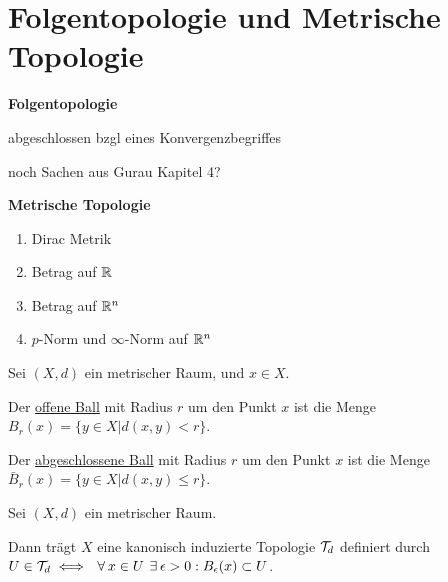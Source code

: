 \section{Folgentopologie und Metrische Topologie}

\textbf{Folgentopologie}


\begin{definition}[Folgentopologie]
    abgeschlossen bzgl eines Konvergenzbegriffes
\end{definition}

\begin{definition}[Folgenkompakt]
    
\end{definition}

noch Sachen aus Gurau Kapitel 4?



\textbf{Metrische Topologie}


\begin{definition}
    
\end{definition}

\begin{example}
    \begin{enumerate}
        \item Dirac Metrik
        \item Betrag auf $\mathbb{R}$
        \item Betrag auf $\mathbb{R}^n$
        \item $p$-Norm und $\infty$-Norm auf $\mathbb{R}^n$
    \end{enumerate}
\end{example}

\begin{definition}
    Sei $(X, d)$ ein metrischer Raum, und $x \in X$.

    Der \underline{offene Ball} mit Radius $r$ um den Punkt $x$ ist die Menge $B_r(x) = \{y \in X | d(x,y) < r\}$.

    Der \underline{abgeschlossene Ball} mit Radius $r$ um den Punkt $x$ ist die Menge $\bar{B}_r(x) = \{y \in X | d(x,y) \leq r\}$.
\end{definition}

\begin{proposition}
    \label{lem-metric-induces-topology}
    Sei $(X, d)$ ein metrischer Raum.

    Dann trägt $X$ eine kanonisch induzierte Topologie $\mathcal{T}_d$ definiert durch $U \in \T_d \iff \forall x \in U \exists \epsilon > 0: B_{\epsilon}(x) \subset U$.
\end{proposition}

